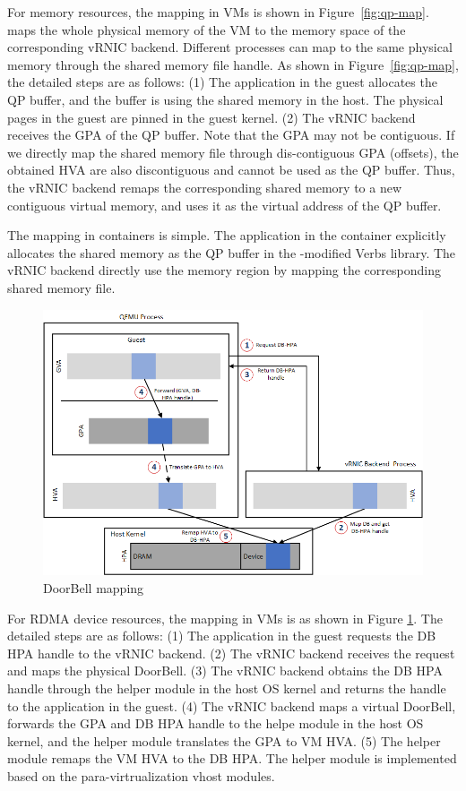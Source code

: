 For memory resources, the mapping in VMs is shown in Figure~\ref{fig:qp-map}. \sys maps the whole physical memory of the VM to the memory space of the corresponding vRNIC backend. Different processes can map to the same physical memory through the shared memory file handle. As shown in Figure~\ref{fig:qp-map}, the detailed steps are as follows: (1) The application in the guest allocates the QP buffer, and the buffer is using the shared memory in the host. The physical pages in the guest are pinned in the guest kernel. (2) The vRNIC backend receives the GPA of the QP buffer. Note that the GPA may not be contiguous. If we directly map the shared memory file through dis-contiguous GPA (offsets), the obtained HVA are also discontiguous and cannot be used as the QP buffer. Thus, the vRNIC backend remaps the corresponding shared memory to a new contiguous virtual memory, and uses it as the virtual address of the QP buffer.



The mapping in containers is simple. The application in the container explicitly allocates the shared memory as the QP buffer in the \sys-modified Verbs library. The vRNIC backend directly use the memory region by mapping the corresponding shared memory file.


\begin{figure}[!ht]
	\centering
	\includegraphics[width=1\linewidth]{images/db-map.png}
	\caption{DoorBell mapping}
	\label{fig:db-map}
\end{figure}

For RDMA device resources, the mapping in VMs is as shown in Figure \ref{fig:db-map}. The detailed steps are as follows: (1) The application in the guest requests the DB HPA handle to the vRNIC backend. (2) The vRNIC backend receives the request and maps the physical DoorBell. (3) The vRNIC backend obtains the DB HPA handle through the helper module in the host OS kernel and returns the handle to the application in the guest. (4) The vRNIC backend maps a virtual DoorBell, forwards the GPA and DB HPA handle to the helpe module in the host OS kernel, and the helper module translates the GPA to VM HVA. (5) The helper module remaps the VM HVA to the DB HPA. The helper module is implemented based on the para-virtrualization vhost modules.

